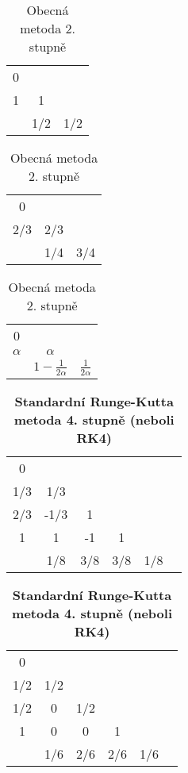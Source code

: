 \documentclass[12pt, a4paper,
 twoside,        %
 openright
]{report}
\begin{document}
\begin{table}[H]
    \parbox{.3\linewidth}{
        \centering
        \caption[Butcherova tabulka Heunovy metody]{Heunova metoda}
        \begin{tabular}{c | c c}
            0 &           \\
            1 & 1         \\
            \hline
              & 1/2 & 1/2 \\
        \end{tabular}
    }
    \hfill
    \parbox{.3\linewidth}{
        \centering
        \caption[Butcherova tabulka Ralstonovy metody]{Ralstonova metoda}
        \begin{tabular}{c | c c}
            0   &           \\
            2/3 & 2/3       \\
            \hline
                & 1/4 & 3/4 \\
        \end{tabular}
    }
    \hfill
    \parbox{.3\linewidth}{
        \centering
        \caption[Butcherova tabulka obecné metody 2. stupně]{Obecná metoda 2. stupně}
        \begin{tabular}{c | c c}
            0        &                                               \\
            $\alpha$ & $\alpha$                                      \\
            \hline
                     & $1 - \frac{1}{2\alpha}$ & $\frac{1}{2\alpha}$ \\
        \end{tabular}
    }
\end{table}

\begin{table}[H]
    \parbox{.45\linewidth}{
        \centering
        \caption[Butcherova tabulka Simpsonova pravidla 3/8]{Simpsonovo pravidlo 3/8}
        \begin{tabular}{c | c c c c c}
            0   &                        \\
            1/3 & 1/3                    \\
            2/3 & -1/3 & 1               \\
            1   & 1    & -1  & 1         \\
            \hline
                & 1/8  & 3/8 & 3/8 & 1/8 \\
        \end{tabular}
    }
    \hfill
    \parbox{.45\linewidth}{
        \centering
        \caption[Butcherova tabulka RK4]{\textbf{Standardní Runge-Kutta metoda 4. stupně (neboli RK4)}}
        \begin{tabular}{c | c c c c c}
            0   &                       \\
            1/2 & 1/2                   \\
            1/2 & 0   & 1/2             \\
            1   & 0   & 0   & 1         \\
            \hline
                & 1/6 & 2/6 & 2/6 & 1/6 \\
        \end{tabular}
    }
\end{table}
\end{document}
